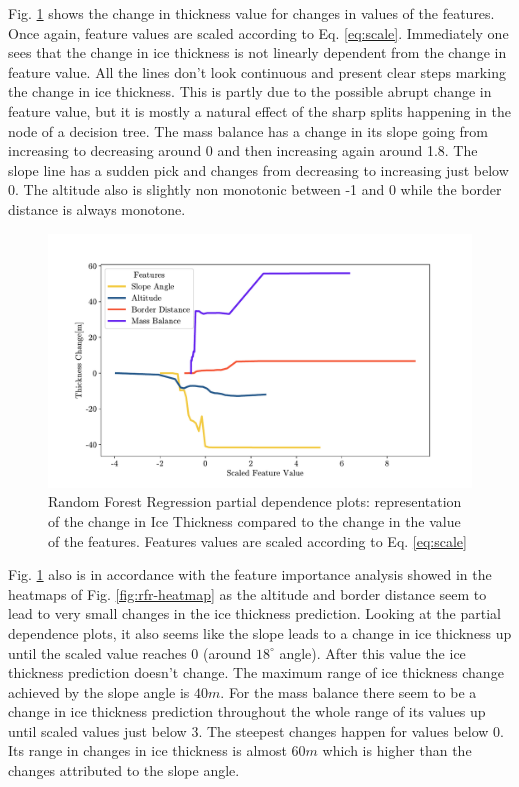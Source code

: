 Fig. \ref{fig:rfr-pdp} shows the change in thickness value for changes in values of the features. Once again, feature values are scaled according to Eq. \ref{eq:scale}. Immediately one sees that the change in ice thickness is not linearly dependent from the change in feature value. All the lines don't look continuous and present clear steps marking the change in ice thickness. This is partly due to the possible abrupt change in feature value, but it is mostly a natural effect of the sharp splits happening in the node of a decision tree.  The mass balance has a change in its slope going from increasing to decreasing around 0 and then increasing again around 1.8. The slope line has a sudden pick and changes from decreasing to increasing just below 0. The altitude also is slightly non monotonic between -1 and 0 while the border distance is always monotone. 
\begin{figure}[!tp]
	\centering		  
	\includegraphics[width=1.\textwidth]{figures/RFR_pdp.pdf}
	\caption{Random Forest Regression partial dependence plots: representation of the change in Ice Thickness compared to the change in the value of the features. Features values are scaled according to Eq. \ref{eq:scale}}
	\label{fig:rfr-pdp}
\end{figure}

Fig. \ref{fig:rfr-pdp} also is in accordance with the feature importance analysis showed in the heatmaps of Fig. \ref{fig:rfr-heatmap} as the altitude and border distance seem to lead to very small changes in the ice thickness prediction. Looking at the partial dependence plots, it also seems like the slope leads to a change in ice thickness up until the scaled value reaches 0 (around $18^{\circ}$ angle). After this value the ice thickness prediction doesn't change. The maximum range of ice thickness change achieved by the slope angle is $40m$. For the mass balance there seem to be a change in ice thickness prediction throughout the whole range of its values up until scaled values just below 3. The steepest changes happen for values below 0. Its range in changes in ice thickness is almost $60m$ which is higher than the changes attributed to the slope angle.



